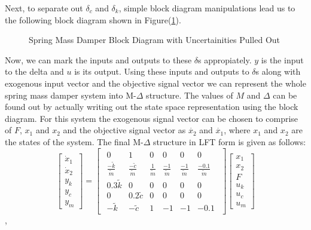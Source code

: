 \documentclass[a4paper,12pt]{article}
\begin{document}
				Next, to separate out $\delta_{c}$ and $\delta_{k}$, simple block diagram manipulations lead us to the following block diagram shown in Figure(\ref{smd3}).
				\begin{figure}[H]
 
			  \centering
			  
			  
			  \caption{Spring Mass Damper Block Diagram with Uncertainities Pulled Out}
			 \label{smd3}
		\end{figure}	 Now, we can mark the inputs and outputs to these $\delta$s appropiately. $y$ is the input to the delta and $u$ is its output. Using these inputs and outputs to $\delta$s along with exogenous input vector and the objective signal vector we can represent the whole spring mass damper system into M-$\Delta$ structure. The values of $M$ and $\Delta$ can be found out by actually writing out the state space representation using the block diagram. For this system the exogenous signal vector can be chosen to comprise of $F$, $x_{1}$ and $x_{2}$ and the objective signal vector as $\dot{x_{2}}$ and $\dot{x_{1}}$, where $x_{1}$ and $x_{2}$ are the states of the system. The final M-$\Delta$ structure in LFT form is given as follows:
			\[
			\begin{bmatrix}
				\dot{x}_{1}\\
				\dot{x}_{2}\\
				\hline
				y_{k}\\
				y_{c}\\
				y_{m}
			\end{bmatrix}
			=
			\begin{bmatrix}
				\begin{array}{ccc|ccc}
					0 & 1 & 0 & 0 & 0 & 0 \\
					\frac{-\tilde{k}}{\tilde{m}} & \frac{-\tilde{c}}{\tilde{m}} & \frac{1}{\tilde{m}} & \frac{-1}{\tilde{m}} & \frac{-1}{\tilde{m}} & \frac{-0.1}{\tilde{m}} \\ \hline
					0.3\tilde{k} & 0 & 0 & 0 & 0 & 0\\
					0 & 0.2\tilde{c} & 0 & 0 & 0 & 0 \\
					-\tilde{k} & -\tilde{c} & 1 & -1 & -1 & -0.1
				\end{array}
			\end{bmatrix}
			\begin{bmatrix}
			x_{1}\\
			x_{2}\\
			F\\ \hline
			u_{k}\\
			u_{c}\\
			u_{m}
			\end{bmatrix}
			\],
\end{document}
